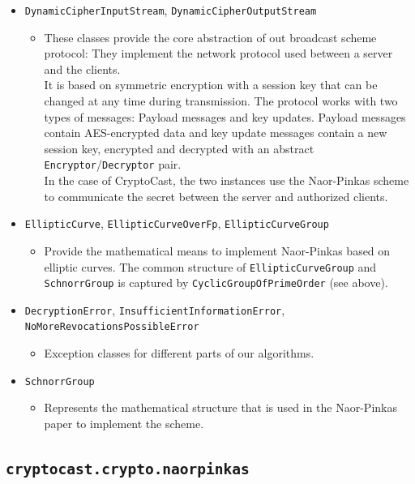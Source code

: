\documentclass[a4paper,10pt]{scrartcl}
\begin{document}
\begin{itemize}
  \item \lstinline|DynamicCipherInputStream|, \lstinline|DynamicCipherOutputStream|
  \begin{itemize}
   \item These classes provide the core abstraction of out broadcast scheme protocol: They
   implement the network protocol used between a server and the clients. \\
   It is based on symmetric encryption with a session key that can be changed at any
   time during transmission.
   The protocol works with two types of messages: Payload messages and key updates.
   Payload messages contain AES-encrypted data and key update messages contain a new session key,
   encrypted and decrypted with an abstract \lstinline|Encryptor|/\lstinline|Decryptor| pair. \\
   In the case of CryptoCast, the two instances use the Naor-Pinkas scheme to communicate
   the secret between the server and authorized clients.
  \end{itemize}

  \item \lstinline|EllipticCurve|, \lstinline|EllipticCurveOverFp|, \lstinline|EllipticCurveGroup|
  \begin{itemize}
   \item Provide the mathematical means to implement Naor-Pinkas based on elliptic curves.
   The common structure of \lstinline|EllipticCurveGroup| and \lstinline|SchnorrGroup| is
   captured by  \lstinline|CyclicGroupOfPrimeOrder| (see above).
  \end{itemize}

   \item \lstinline|DecryptionError|, \lstinline|InsufficientInformationError|, \lstinline|NoMoreRevocationsPossibleError|
  \begin{itemize}
   \item Exception classes for different parts of our algorithms.
  \end{itemize}

  \item \lstinline|SchnorrGroup|
  \begin{itemize}
   \item Represents the mathematical structure that is used in the Naor-Pinkas paper
   to implement the scheme.
  \end{itemize}

\end{itemize}

\subsection{\lstinline|cryptocast.crypto.naorpinkas|}
\end{document}
